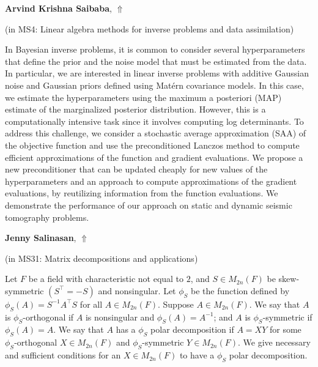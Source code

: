 \documentclass[ILAS2025-program.tex]{subfiles}
\begin{document}
\hypertarget{down0358}{}\begin{ilasabstract}
    
\textbf{Arvind Krishna Saibaba},  \hfill \hyperlink{up0358}{$\Uparrow$}
    
    
(in {\color{mstitle}MS4: Linear algebra methods for inverse problems and data assimilation})
        
\mtskip
    In Bayesian inverse problems, it is common to consider several hyperparameters that define the prior and the noise model that must be estimated from the data. In particular, we are interested in linear inverse problems with additive Gaussian noise and Gaussian priors defined using Matérn covariance models. In this case, we estimate the hyperparameters using the maximum a posteriori (MAP) estimate of the marginalized posterior distribution. However, this is a computationally intensive task since it involves computing log determinants. To address this challenge, we consider a stochastic average approximation (SAA) of the objective function and use the preconditioned Lanczos method to compute efficient approximations of the function and gradient evaluations. We propose a new preconditioner that can be updated cheaply for new values of the hyperparameters and an approach to compute approximations of the gradient evaluations, by reutilizing information from the function evaluations. We demonstrate the performance of our approach on static and dynamic seismic tomography problems.

\end{ilasabstract}
    

\hypertarget{down0276}{}\begin{ilasabstract}
    
\textbf{Jenny Salinasan},  \hfill \hyperlink{up0276}{$\Uparrow$}
    
    
(in {\color{mstitle}MS31: Matrix decompositions and applications})
        
\mtskip
    Let $F$ be a field with characteristic not equal to $2$, and $S \in M_{2n}(F)$ be skew-symmetric $(S^{\top}=-S)$ and nonsingular.
Let $\phi_S$ be the function defined by $\phi_S(A)=S^{-1}A^{\top}S$ for all $A \in M_{2n}(F)$.
Suppose $A \in M_{2n}(F)$.
We say that $A$ is $\phi_S$-orthogonal if $A$ is nonsingular and $\phi_S(A)=A^{-1}$; and $A$ is $\phi_S$-symmetric if $\phi_S(A)=A$.
We say that $A$ has a $\phi_S$ polar decomposition if $A=XY$ for some $\phi_S$-orthogonal $X \in M_{2n}(F)$ and $\phi_S$-symmetric $Y \in M_{2n}(F)$.
We give necessary and sufficient conditions for an $X \in M_{2n}(F)$ to have a $\phi_S$ polar decomposition.
\end{ilasabstract}
    
\end{document}
